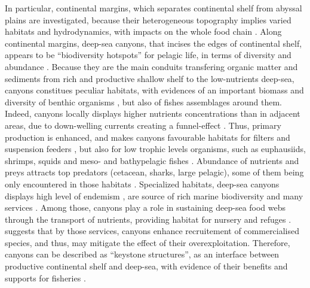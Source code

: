 In particular, continental margins, which separates continental shelf from abyssal plains are investigated, because their heterogeneous topography implies varied habitats and hydrodynamics, with impacts on the whole food chain \citep{danovaro2009,fernandez-arcaya2017}. Along continental margins, deep-sea canyons, that incises the edges of continental shelf, appears to be ``biodiversity hotspots'' for pelagic life, in terms of diversity and abundance \citep{aissi2012,danovaro2009,gillet2013,robertson2020}. Because they are the main conduits transfering organic matter and sediments from rich and productive shallow shelf to the low-nutrients deep-sea, canyons constitues peculiar habitats, with evidences of an important biomass and diversity of benthic organisms \citep{canals2006,danovaro2009,deleo2012}, but also of fishes assemblages \citep{sion2019,stefanescu1994} around them. Indeed, canyons locally displays higher nutrients concentrations than in adjacent areas, due to down-welling currents creating a funnel-effect \citep{fernandez-arcaya2017}. Thus, primary production is enhanced, and makes canyons favourable habitats for filters and suspension feeders \citep{fernandez-arcaya2017,sion2019}, but also for low trophic levels organisms, such as euphausiids, shrimps, squids and meso- and bathypelagic fishes \citep{aissi2012,gaskett2001,pusch2004}. Abundance of nutrients and preys attracts top predators (cetacean, sharks, large pelagic), some of them being only encountered in those habitats \citep{aissi2012}. Specialized habitats, deep-sea canyons displays high level of endemism \citep{danovaro2009,danovaro2017}, are source of rich marine biodiversity and many services \citep{fernandez-arcaya2017}. Among those, canyons play a role in sustaining deep-sea food webs through the transport of nutrients, providing habitat for nursery and refuges \citep{fernandez-arcaya2017}. \citet{company2008} suggests that by those services, canyons enhance recruitement of commercialised species, and thus, may mitigate the effect of their overexploitation. Therefore, canyons can be described as ``keystone structures'', as an interface between productive continental shelf and deep-sea, with evidence of their benefits and supports for fisheries \citep{company2012,fernandez-arcaya2017}.

